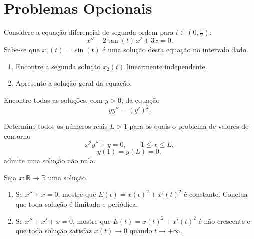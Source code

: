 \documentclass[10pt,a4paper]{amsart}
\newcommand{\R}{\mathbb{R}}
\begin{document}
\vspace{8mm}

\section*{Problemas Opcionais}


\vspace{4mm}

 Considere a equação diferencial de segunda ordem para $t \in \left(0, \frac{\pi}{2}\right)$:
\[
    x'' - 2\tan(t)\,x' + 3x = 0.
\]
Sabe-se que $x_1(t) = \sin(t)$ é uma solução desta equação no intervalo dado.
\begin{enumerate}[label=(\alph*)]
    \item Encontre a segunda solução $x_2(t)$ linearmente independente.
    \item Apresente a solução geral da equação.
\end{enumerate}

\vspace{5mm}

 Encontre todas as soluções, com $y > 0$, da equação
\[
    y y'' = (y')^2.
\]

\vspace{5mm}

 Determine todos os números reais $L > 1$ para os quais o problema de valores de contorno
\[
    x^2 y'' + y = 0, \qquad 1 \leq x \leq L,
\]
\[
    y(1) = y(L) = 0,
\]
admite uma solução não nula.

\vspace{5mm}

 Seja $x : \R \to \R$ uma solução.
\begin{enumerate}[label=(\alph*)]
    \item Se $x'' + x = 0$, mostre que $E(t) = x(t)^2 + x'(t)^2$ é constante. Conclua que toda solução é limitada e periódica.
    \item Se $x'' + x' + x = 0$, mostre que $E(t) = x(t)^2 + x'(t)^2$ é não-crescente e que toda solução satisfaz $x(t) \to 0$ quando $t \to +\infty$.
\end{enumerate}

\vspace{5mm}
\end{document}
